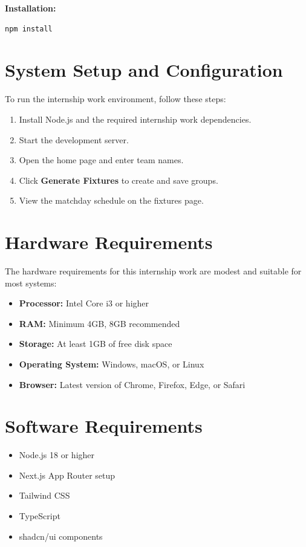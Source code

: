\documentclass[12pt,a4paper]{report}
\begin{document}
\textbf{Installation:}
\begin{verbatim}
npm install
\end{verbatim}

\section{System Setup and Configuration}
To run the internship work environment, follow these steps:
\begin{enumerate}
    \item Install Node.js and the required internship work dependencies.
    \item Start the development server.
    \item Open the home page and enter team names.
    \item Click \textbf{Generate Fixtures} to create and save groups.
    \item View the matchday schedule on the fixtures page.
\end{enumerate}

\section{Hardware Requirements}
The hardware requirements for this internship work are modest and suitable for most systems:
\begin{itemize}
    \item \textbf{Processor:} Intel Core i3 or higher
    \item \textbf{RAM:} Minimum 4GB, 8GB recommended
    \item \textbf{Storage:} At least 1GB of free disk space
    \item \textbf{Operating System:} Windows, macOS, or Linux
    \item \textbf{Browser:} Latest version of Chrome, Firefox, Edge, or Safari
\end{itemize}

\section{Software Requirements}
\begin{itemize}
    \item Node.js 18 or higher
    \item Next.js App Router setup
    \item Tailwind CSS
    \item TypeScript
    \item shadcn/ui components
\end{itemize}
\end{document}
